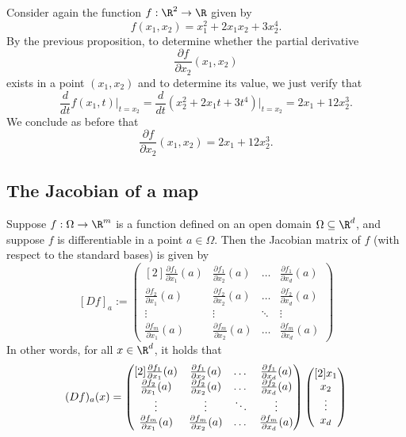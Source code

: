 \begin{example}
    Consider again the function $f: \R^2\to\R$ given by
    $$f(x_1,x_2) = x_1^2+2x_1x_2+3x_2^4.$$
    By the previous proposition, to determine whether the partial derivative
    $$\frac{\partial f}{\partial x_2}(x_1,x_2)$$
    exists in a point $(x_1,x_2)$ and to determine its value, we just verify that
    $$\frac{d}{dt}f(x_1,t)\Bigr|_{t=x_2}=\frac{d}{dt}(x_2^2+2x_1t+3t^4)\Bigr|_{t=x_2}=2x_1+12x_2^3.$$
    We conclude as before that
    $$\frac{\partial f}{\partial x_2}(x_1,x_2) = 2x_1+12x_2^3.$$
\end{example}

\subsection{The Jacobian of a map}
\begin{proposition}
    Suppose $f: \Omega \to \R^m$ is a function defined on an open domain $\Omega \subseteq \R^d$,
    and suppose $f$ is differentiable in a point $a \in \Omega$. Then the Jacobian matrix of $f$
    (with respect to the standard bases) is given by
    $$[Df]_a := \begin{pmatrix}[2]
        \frac{\partial f_1}{\partial x_1}(a) & \frac{\partial f_1}{\partial x_2}(a) & \dots & \frac{\partial f_1}{\partial x_d}(a) \\
        \frac{\partial f_2}{\partial x_1}(a) & \frac{\partial f_2}{\partial x_2}(a) & \dots & \frac{\partial f_2}{\partial x_d}(a) \\
        \vdots & \vdots & \ddots & \vdots \\
        \frac{\partial f_m}{\partial x_1}(a) & \frac{\partial f_m}{\partial x_2}(a) & \dots & \frac{\partial f_m}{\partial x_d}(a)
    \end{pmatrix}$$
    In other words, for all $x \in \R^d$, it holds that
    $$(Df)_a(x) = 
    \begingroup 
    \begin{pmatrix}[2]
        \frac{\partial f_1}{\partial x_1}(a) & \frac{\partial f_1}{\partial x_2}(a) & \dots & \frac{\partial f_1}{\partial x_d}(a) \\
        \frac{\partial f_2}{\partial x_1}(a) & \frac{\partial f_2}{\partial x_2}(a) & \dots & \frac{\partial f_2}{\partial x_d}(a) \\
        \vdots & \vdots & \ddots & \vdots \\
        \frac{\partial f_m}{\partial x_1}(a) & \frac{\partial f_m}{\partial x_2}(a) & \dots & \frac{\partial f_m}{\partial x_d}(a)
    \end{pmatrix}
    \begin{pmatrix}[2]
        x_1 \\ x_2 \\ \vdots \\ x_d
    \end{pmatrix}
    \endgroup
    $$
\end{proposition}

